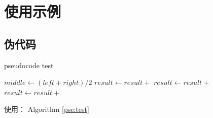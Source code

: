 \documentclass[twocolumn, twoside]{article}
\title{}
\author{}
\begin{document}



\section{使用示例}
\subsection{伪代码}

\begin{algorithm}
 \caption{pseudocode test}
 \label{pse:test}
 \scriptsize
 \begin{algorithmic}[1]
    \State $middle \gets (left + right) / 2$
    \State $result \gets result +$ 
    \State $result \gets result +$ 
    \State $result \gets result +$ 
    
 \EndIf
\end{algorithmic}

\end{algorithm}
使用： Algorithm \ref{pse:test}
\end{document}
